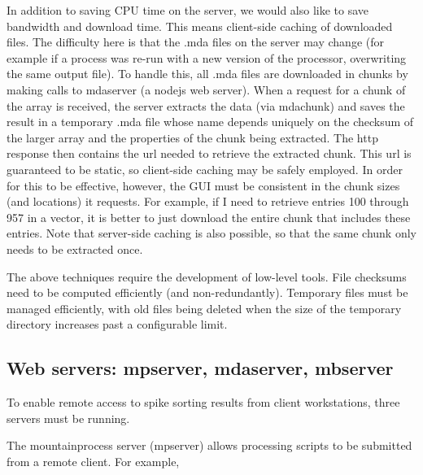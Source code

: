 \documentclass{article}
\begin{document}
In addition to saving CPU time on the server, we would also like to save bandwidth and download time. This means client-side caching of downloaded files. The difficulty here is that the .mda files on the server may change (for example if a process was re-run with a new version of the processor, overwriting the same output file). To handle this, all .mda files are downloaded in chunks by making calls to mdaserver (a nodejs web server). When a request for a chunk of the array is received, the server extracts the data (via mdachunk) and saves the result in a temporary .mda file whose name depends uniquely on the checksum of the larger array and the properties of the chunk being extracted. The http response then contains the url needed to retrieve the extracted chunk. This url is guaranteed to be static, so client-side caching may be safely employed. In order for this to be effective, however, the GUI must be consistent in the chunk sizes (and locations) it requests. For example, if I need to retrieve entries 100 through 957 in a vector, it is better to just download the entire chunk that includes these entries. Note that server-side caching is also possible, so that the same chunk only needs to be extracted once.

The above techniques require the development of low-level tools. File checksums need to be computed efficiently (and non-redundantly). Temporary files must be managed efficiently, with old files being deleted when the size of the temporary directory increases past a configurable limit.

\subsection{Web servers: mpserver, mdaserver, mbserver}

To enable remote access to spike sorting results from client workstations, three servers must be running. 

The mountainprocess server (mpserver) allows processing scripts to be submitted from a remote client. For example, 
\end{document}
